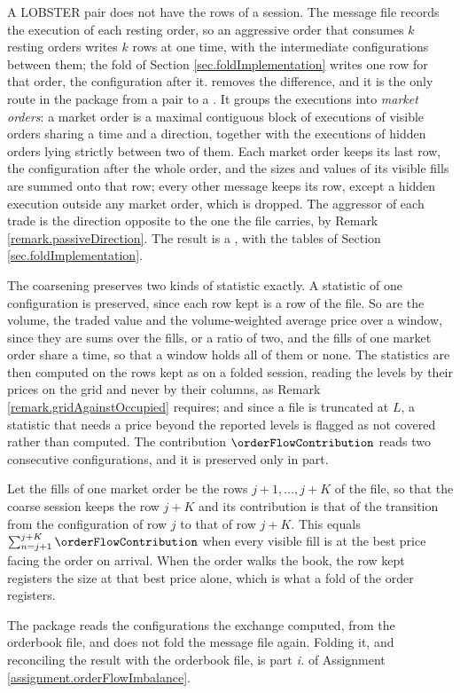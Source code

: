 A LOBSTER pair does not have the rows of a session.
The message file records the execution of each resting order,
so an aggressive order that consumes $k$ resting orders writes $k$ rows at one time,
with the intermediate configurations between them;
the fold of Section \ref{sec.foldImplementation} writes one row for that order,
the configuration after it.
 removes the difference,
and it is the only route in the package from a pair to a .
It groups the executions into \emph{market orders}:
a market order is a maximal contiguous block of executions of visible orders
sharing a time and a direction,
together with the executions of hidden orders lying strictly between two of them.
Each market order keeps its last row, the configuration after the whole order,
and the sizes and values of its visible fills are summed onto that row;
every other message keeps its row,
except a hidden execution outside any market order, which is dropped.
The aggressor of each trade is the direction opposite to the one the file carries,
by Remark \ref{remark.passiveDirection}.
The result is a , with the tables of
Section \ref{sec.foldImplementation}.

The coarsening preserves two kinds of statistic exactly.
A statistic of one configuration is preserved, since each row kept is a row of the file.
So are the volume, the traded value and the volume-weighted average price over a window,
since they are sums over the fills, or a ratio of two,
and the fills of one market order share a time, so that a window holds all of them or none.
The statistics are then computed on the rows kept as on a folded session,
reading the levels by their prices on the grid and never by their columns,
as Remark \ref{remark.gridAgainstOccupied} requires;
and since a file is truncated at $L$,
a statistic that needs a price beyond the reported levels is flagged as not covered
rather than computed.
The contribution $\orderFlowContribution$ reads two consecutive configurations,
and it is preserved only in part.

\begin{remark}\label{remark.coarseContribution}
 Let the fills of one market order be the rows $j+1, \dots, j+K$ of the file,
 so that the coarse session keeps the row $j+K$ and its contribution is that
 of the transition from the configuration of row $j$ to that of row $j+K$.
 This equals $\sum_{n=j+1}^{j+K} \orderFlowContribution$
 when every visible fill is at the best price facing the order on arrival.
 When the order walks the book, the row kept registers the size at that best price alone,
 which is what a fold of the order registers.
\end{remark}

The package reads the configurations the exchange computed, from the orderbook file,
and does not fold the message file again.
Folding it, and reconciling the result with the orderbook file,
is part \emph{i.} of Assignment \ref{assignment.orderFlowImbalance}.
